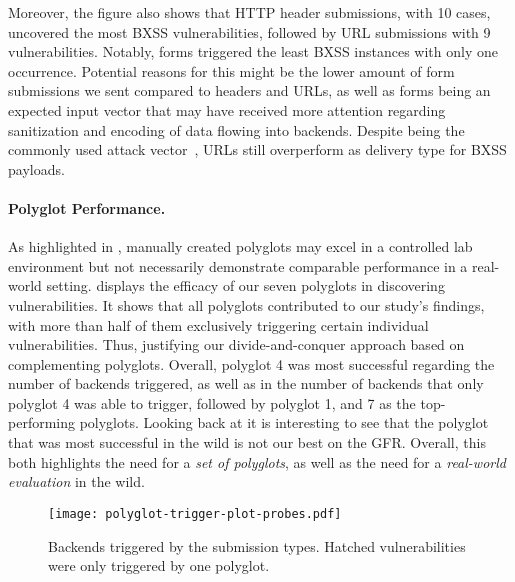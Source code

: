 Moreover, the figure also shows that HTTP header submissions, with \num{10} cases, uncovered the most BXSS vulnerabilities, followed by URL submissions with \num{9} vulnerabilities.
Notably, forms triggered the least BXSS instances with only one occurrence.
Potential reasons for this might be the lower amount of form submissions we sent compared to headers and URLs, as well as forms being an expected input vector that may have received more attention regarding sanitization and encoding of data flowing into backends.
Despite being the commonly used attack vector~\cite{LekStoJoh13,MelDasShaBau+18,StoPfiKaiLek+15,stock2017web,BenKleBarJoh21,KleBarBen+22}, URLs still overperform as delivery type for BXSS payloads.

\paragraph{Polyglot Performance.}
As highlighted in , manually created polyglots %
may excel in a controlled lab environment but not necessarily demonstrate comparable performance in a real-world setting.
 displays the efficacy of our seven polyglots in discovering \blindxss{} vulnerabilities.
It shows that all polyglots contributed to our study's findings, with more than half of them exclusively triggering certain individual vulnerabilities.
Thus, justifying our divide-and-conquer approach based on complementing polyglots.
Overall, polyglot \num{4} was most successful regarding the number of backends triggered, as well as in the number of backends that only polyglot \num{4} was able to trigger, followed by polyglot \num{1}, and \num{7} as the top-performing polyglots.
Looking back at  it is interesting to see that the polyglot that was most successful in the wild is not our best on the GFR\@. %
Overall, this both highlights the need for a \emph{set of polyglots}, as well as the need for a \emph{real-world evaluation} in the wild.

\begin{figure}[htb]
    \centering
    \texttt{[image: polyglot-trigger-plot-probes.pdf]}
    \caption{
    Backends triggered by the submission types. Hatched vulnerabilities were only triggered by one polyglot.
    }%
    \vspace{-1em}
    \label{fig:polyglot-trigger-plot}
\end{figure}
